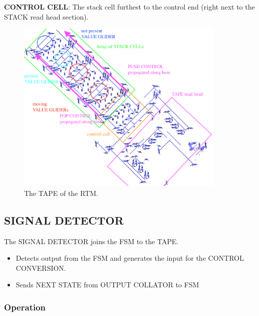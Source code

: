 \documentclass{article}
\begin{document}
\vspace{1em}

\noindent\textbf{CONTROL CELL}: The stack cell furthest to the control end (right next to the STACK read head section).

\vspace{1em}

\begin{figure}[h]
\centering
\includegraphics[width=10cm,keepaspectratio]{images/TAPE.png}
\captionsetup{labelformat=empty} \caption{The TAPE of the RTM.}
\end{figure}
\subsection{SIGNAL DETECTOR}


The SIGNAL DETECTOR joins the FSM to the TAPE.
\begin{itemize}
\item Detects output from the FSM and generates the input for the CONTROL CONVERSION.


\item Sends NEXT STATE from OUTPUT COLLATOR to FSM

\end{itemize}

\subsubsection{Operation}
\end{document}
